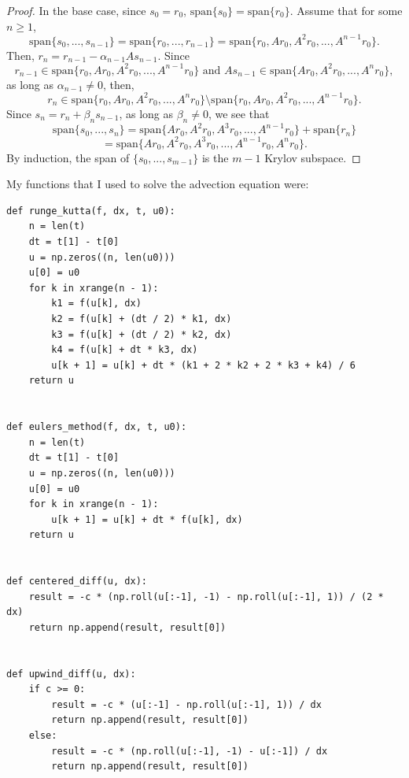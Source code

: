 \documentclass[10pt]{article}
\begin{document}
\begin{itemize}
\begin{proof}
In the base case, since $ s_0 = r_0 $, $ \text{span}\{ s_0 \} = \text{span}\{ r_0 \} $. Assume that for some $ n \geq 1 $, $$
\text{span}\{ s_0, ... , s_{n-1} \} = \text{span}\{ r_0, ... , r_{n-1} \} = \text{span}\{r_0, Ar_0, A^2 r_0, ... ,A^{n-1}r_0 \}.
$$ Then, $ r_{n} = r_{n - 1} - \alpha_{n-1} A s_{n-1} $. Since $$ r_{n - 1} \in \text{span}\{r_0, Ar_0, A^2 r_0, ... ,A^{n-1}r_0 \} \text{ and } A s_{n-1} \in \text{span}\{ Ar_0, A^2 r_0, ... ,A^{n}r_0 \},  $$ as long as $ \alpha_{n-1} \neq 0 $, then, $$ r_{n} \in \text{span}\{r_0, Ar_0, A^2 r_0, ... ,A^{n}r_0 \} \setminus \text{span}\{r_0, Ar_0, A^2 r_0, ... ,A^{n-1}r_0 \}. $$ Since $ s_{n} = r_{n} + \beta_{n} s_{n-1}  $, as long as $ \beta_{n} \neq 0 $, we see that $$
\text{span}\{ s_0, ... , s_{n} \} = \text{span}\{ Ar_0, A^2 r_0, A^3 r_0, ... ,A^{n-1}r_0 \} + \text{span}\{ r_{n} \}
$$ $$
= \text{span}\{ Ar_0, A^2 r_0, A^3 r_0, ... ,A^{n-1}r_0, A^n r_0 \}.
$$ By induction, the span of $ \{ s_0, ... , s_{m-1} \} $ is the $ m-1 $ Krylov subspace.  \end{proof}

\newpage

\end{itemize}

My functions that I used to solve the advection equation were:

\begin{lstlisting}
def runge_kutta(f, dx, t, u0):
    n = len(t)
    dt = t[1] - t[0]
    u = np.zeros((n, len(u0)))
    u[0] = u0
    for k in xrange(n - 1):
        k1 = f(u[k], dx)
        k2 = f(u[k] + (dt / 2) * k1, dx)
        k3 = f(u[k] + (dt / 2) * k2, dx)
        k4 = f(u[k] + dt * k3, dx)
        u[k + 1] = u[k] + dt * (k1 + 2 * k2 + 2 * k3 + k4) / 6
    return u


def eulers_method(f, dx, t, u0):
    n = len(t)
    dt = t[1] - t[0]
    u = np.zeros((n, len(u0)))
    u[0] = u0
    for k in xrange(n - 1):
        u[k + 1] = u[k] + dt * f(u[k], dx)
    return u


def centered_diff(u, dx):
    result = -c * (np.roll(u[:-1], -1) - np.roll(u[:-1], 1)) / (2 * dx)
    return np.append(result, result[0])


def upwind_diff(u, dx):
    if c >= 0:
        result = -c * (u[:-1] - np.roll(u[:-1], 1)) / dx
        return np.append(result, result[0])
    else:
        result = -c * (np.roll(u[:-1], -1) - u[:-1]) / dx
        return np.append(result, result[0])
\end{lstlisting}
\end{document}
